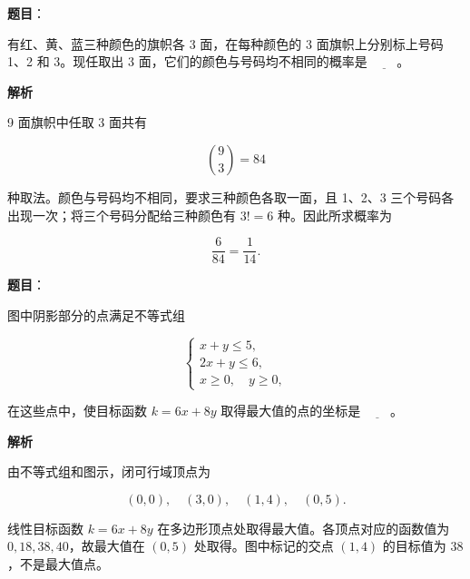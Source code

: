 \begin{answer}

\textbf{题目}：

有红、黄、蓝三种颜色的旗帜各 3 面，在每种颜色的 3 面旗帜上分别标上号码 1、2 和 3。现任取出 3 面，它们的颜色与号码均不相同的概率是 $\underline{\qquad}$。

\textbf{解析}

9 面旗帜中任取 3 面共有

\nopagebreak[4]
\[
\binom93=84
\]

种取法。颜色与号码均不相同，要求三种颜色各取一面，且 1、2、3 三个号码各出现一次；将三个号码分配给三种颜色有 $3!=6$ 种。因此所求概率为

\nopagebreak[4]
\[
\frac{6}{84}=\frac1{14}.
\]


\end{answer}
\begin{answer}

\textbf{题目}：

图中阴影部分的点满足不等式组

\nopagebreak[4]
\[
\begin{cases}
x+y\leq 5,\\
2x+y\leq 6,\\
x\geq 0,\quad y\geq 0,
\end{cases}
\]

在这些点中，使目标函数 $k=6x+8y$ 取得最大值的点的坐标是 $\underline{\qquad}$。
\nopagebreak[4]
\begin{center}\end{center}
\nopagebreak[4]
\textbf{解析}

由不等式组和图示，闭可行域顶点为

\nopagebreak[4]
\[
(0,0),\quad(3,0),\quad(1,4),\quad(0,5).
\]

线性目标函数 $k=6x+8y$ 在多边形顶点处取得最大值。各顶点对应的函数值为 $0,18,38,40$，故最大值在 $(0,5)$ 处取得。图中标记的交点 $(1,4)$ 的目标值为 $38$，不是最大值点。


\end{answer}
